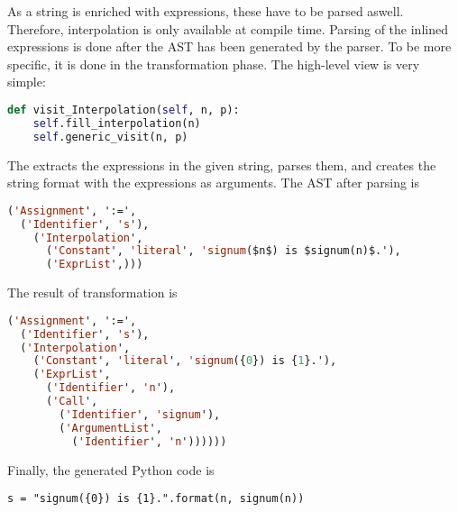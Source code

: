 As a string is enriched with expressions, these have to be parsed aswell. Therefore, interpolation is only available at compile time. Parsing of the inlined expressions is done after the AST has been generated by the parser. To be more specific, it is done in the transformation phase. The high-level view is very simple:

\begin{lstlisting}[language=python]
def visit_Interpolation(self, n, p):
    self.fill_interpolation(n)
    self.generic_visit(n, p)
\end{lstlisting}

The  extracts the expressions in the given string, parses them, and creates the string format with the expressions as arguments. The AST after parsing is

\begin{lstlisting}[language=lisp]
('Assignment', ':=', 
  ('Identifier', 's'), 
    ('Interpolation', 
      ('Constant', 'literal', 'signum($n$) is $signum(n)$.'), 
      ('ExprList',)))
\end{lstlisting}

The result of transformation is

\begin{lstlisting}[language=lisp]
('Assignment', ':=', 
  ('Identifier', 's'), 
  ('Interpolation', 
    ('Constant', 'literal', 'signum({0}) is {1}.'), 
    ('ExprList', 
      ('Identifier', 'n'), 
      ('Call', 
        ('Identifier', 'signum'), 
        ('ArgumentList', 
          ('Identifier', 'n'))))))
\end{lstlisting}

Finally, the generated Python code is 

\begin{lstlisting}
s = "signum({0}) is {1}.".format(n, signum(n))
\end{lstlisting}
